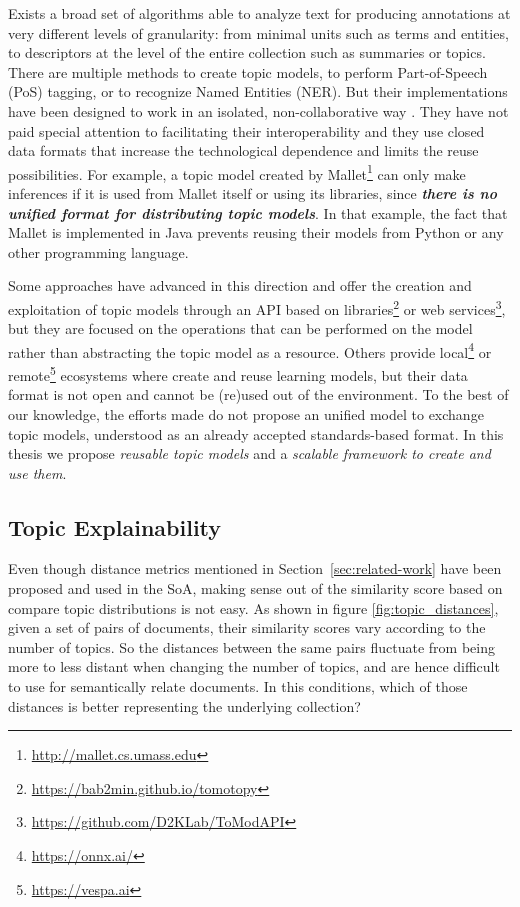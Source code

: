 Exists a broad set of algorithms able to analyze text for producing annotations at very different levels of granularity: from minimal units such as terms and entities, to descriptors at the level of the entire collection such as summaries or topics. There are multiple methods to create topic models, to perform Part-of-Speech (PoS) tagging, or to recognize Named Entities (NER). But their implementations have been designed to work in an isolated, non-collaborative way \citep{Manning2014TheToolkit, Agerri2014}. They have not paid special attention to facilitating their interoperability and they use closed data formats that increase the technological dependence and limits the reuse possibilities. For example, a topic model created by Mallet\footnote{\url{http://mallet.cs.umass.edu}} can only make inferences if it is used from Mallet itself or using its libraries, since \textbf{\textit{there is no unified format for distributing topic models}}. In that example, the fact that Mallet is implemented in Java prevents reusing their models from Python or any other programming language.

Some approaches have advanced in this direction and offer the creation and exploitation of topic models through an API based on libraries\footnote{\url{https://bab2min.github.io/tomotopy}} or web services\footnote{\url{https://github.com/D2KLab/ToModAPI}}\citep{Lisena:NLPOSS2020}, but they are focused on the operations that can be performed on the model rather than abstracting the topic model as a resource. Others provide local\footnote{\url{https://onnx.ai/}} or remote\footnote{\url{https://vespa.ai}} ecosystems where create and reuse learning models, but their data format is not open and cannot be (re)used out of the environment. To the best of our knowledge, the efforts made do not propose an unified model to exchange topic models, understood as an already accepted standards-based format. In this thesis we propose \textit{reusable topic models} and a \textit{scalable framework to create and use them}.  
 

\subsection{Topic Explainability}
\label{sec:topic-explainability}

Even though distance metrics mentioned in Section~\ref{sec:related-work} have been proposed and used in the SoA, making sense out of the similarity score based on compare topic distributions is not easy. As shown in figure \ref{fig:topic_distances}, given a set of pairs of documents, their similarity scores vary according to the number of topics. So the distances between the same pairs fluctuate from being more to less distant when changing the number of topics, and are hence difficult to use for semantically relate documents. In this conditions, which of those distances is better representing the underlying collection?


